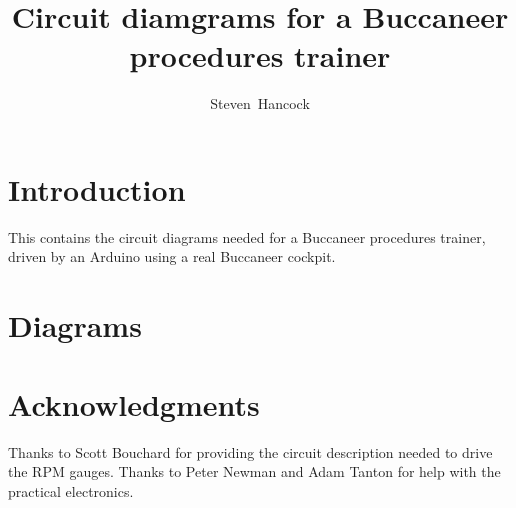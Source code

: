 \documentclass[10pt,oneside]{article}
\begin{document}
\title{Circuit diamgrams for a Buccaneer procedures trainer}
\author{Steven~Hancock}

\maketitle


\section{Introduction}
This contains the circuit diagrams needed for a Buccaneer procedures trainer, driven by an Arduino using a real Buccaneer cockpit.


\section{Diagrams}




\section*{Acknowledgments}
Thanks to Scott Bouchard for providing the circuit description needed to drive the RPM gauges. Thanks to Peter Newman and Adam Tanton for help with the practical electronics.
\end{document}
